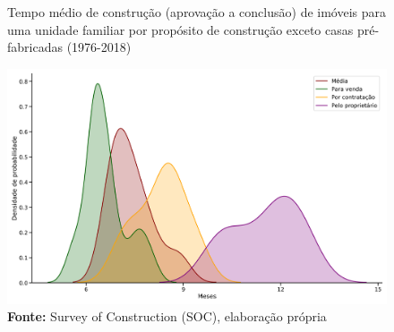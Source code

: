 \begin{figure}[H]
	\centering
	\caption{Tempo médio de construção (aprovação a conclusão) de imóveis para uma unidade familiar por propósito de construção exceto casas pré-fabricadas (1976-2018)}
	\label{meses}
	\includegraphics[width=\textwidth]{Fatos_Estilizados/Figs/Meses_contrucao.png}
	\caption*{\textbf{Fonte:} Survey of Construction (SOC), elaboração própria}
\end{figure}

